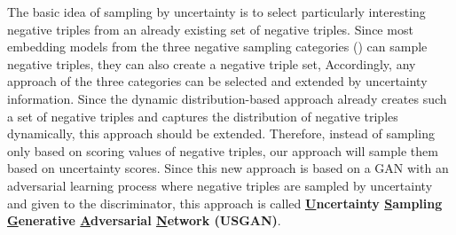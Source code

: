 The basic idea of sampling by uncertainty is to select particularly interesting negative triples from an already existing set of negative triples.
Since most embedding models from the three negative sampling categories () can sample negative triples, they can also create a negative triple set,
Accordingly, any approach of the three categories can be selected and extended by uncertainty information.
Since the dynamic distribution-based approach \kbgan already creates such a set of negative triples and captures the distribution of negative triples dynamically, this approach should be extended.
Therefore, instead of sampling only based on scoring values of negative triples, our approach will sample them based on uncertainty scores.
Since this new approach is based on a \ac{GAN} with an adversarial learning process where negative triples are sampled by uncertainty and given to the discriminator, this approach is called \textbf{\underline{U}ncertainty \underline{S}ampling \underline{G}enerative \underline{A}dversarial \underline{N}etwork (\textsc{USGAN})}.
